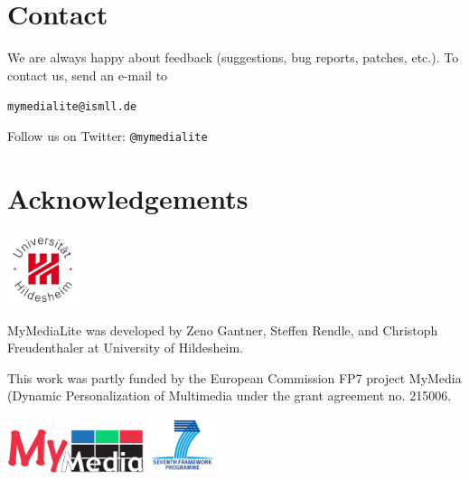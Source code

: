 \documentclass[a4paper, foldmark, 12pt]{leaflet}
\begin{document}
\section{Contact}
We are always happy about feedback (suggestions, bug reports, patches, etc.).
To contact us, send an e-mail to
\begin{center}
	\texttt{mymedialite@ismll.de}
\end{center}

Follow us on Twitter: {\tt @mymedialite}

\section{Acknowledgements}

\begin{floatingfigure}[r]{1.6cm}
	\vspace{-0.5cm}
	\includegraphics[width=2.1cm]{fig/uni-hildesheim-400x400.jpg}
\end{floatingfigure}
MyMediaLite was developed by Zeno Gantner,
Steffen Rendle, and Christoph Freudenthaler
at University of Hildesheim.
	
\vspace{0.4cm}

This work was partly funded by the European Commission FP7 project MyMedia
(Dynamic Personalization of Multimedia under the grant agreement no. 215006.

\vspace{0.2cm}

\begin{center}
	\includegraphics[width=4.0cm]{fig/MyMediaLogoMedium.png}
	\hspace{1.5cm}
	\includegraphics[width=2.0cm]{fig/logo-fp7.png}\\
\end{center}
\end{document}
